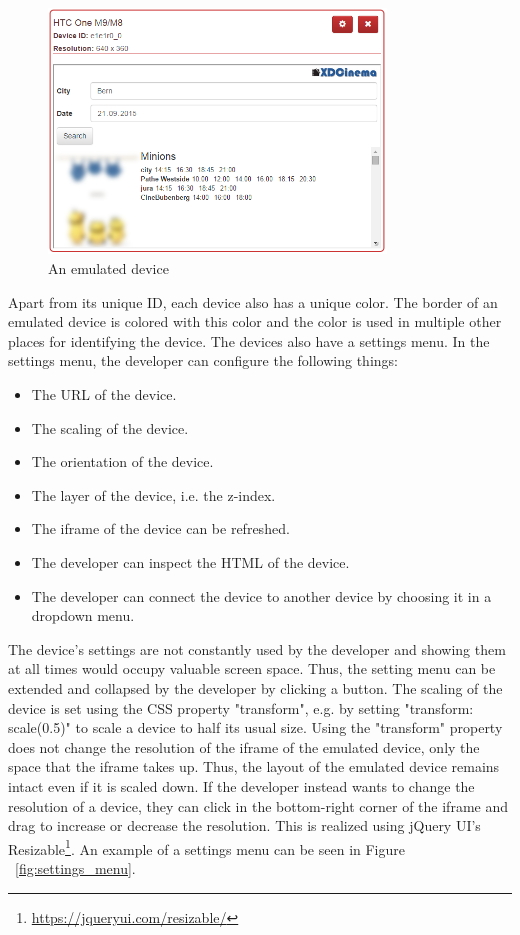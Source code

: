 \begin{figure}[H]
  \centering
    \includegraphics[width=0.8\textwidth]{images/screenshots/emulated_device_3.png}
	\caption{An emulated device}
	\label{fig:emulated_device}
\end{figure}

Apart from its unique ID, each device also has a unique color. The border of an emulated device is colored with this color and the color is used in multiple other places for identifying the device. The devices also have a settings menu. In the settings menu, the developer can configure the following things:
\begin{itemize}
	\item The URL of the device.
	\item The scaling of the device.
	\item The orientation of the device.
	\item The layer of the device, i.e. the z-index. 
	\item The iframe of the device can be refreshed.
	\item The developer can inspect the HTML of the device.
	\item The developer can connect the device to another device by choosing it in a dropdown menu.
\end{itemize}
The device's settings are not constantly used by the developer and showing them at all times would occupy valuable screen space. Thus, the setting menu can be extended and collapsed by the developer by clicking a button. The scaling of the device is set using the CSS property "transform", e.g. by setting "transform: scale(0.5)" to scale a device to half its usual size. Using the "transform" property does not change the resolution of the iframe of the emulated device, only the space that the iframe takes up. Thus, the layout of the emulated device remains intact even if it is scaled down. If the developer instead wants to change the resolution of a device, they can click in the bottom-right corner of the iframe and drag to increase or decrease the resolution. This is realized using jQuery UI's Resizable\footnote{\url{https://jqueryui.com/resizable/}}. An example of a settings menu can be seen in Figure ~\ref{fig:settings_menu}. 

